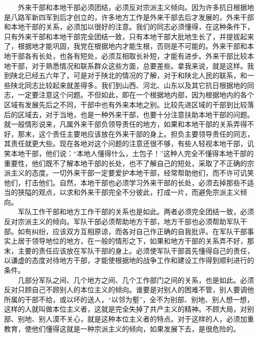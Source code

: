 \documentclass[cn,11pt,chinese]{elegantbook}
\begin{document}
　　外来干部和本地干部必须团结，必须反对宗派主义倾向。因为许多抗日根据地是八路军新四军到后才创立的，许多地方工作是外来干部去后才发展的，外来干部和本地干部的关系，必须加以很好的注意。我们的同志必须懂得，在这种条件下，只有外来干部和本地干部完全团结一致，只有本地干部大批地生长了，并提拔起来了，根据地才能巩固，我党在根据地内才能生根，否则是不可能的。外来干部和本地干部各有长处，也各有短处，必须互相取长补短，才能有进步。外来干部比较本地干部，对于熟悉情况和联系群众这些方面，总要差些。拿我来说，就是这样。我到陕北已经五六年了，可是对于陕北的情况的了解，对于和陕北人民的联系，和一些陕北同志比较起来就差得多。我们到山西、河北、山东以及其它抗日根据地的同志，一定要注意这个问题。不但如此，即在一个根据地内部，因为根据地内的各个区域有发展先后之不同，干部中也有外来本地之别。比较先进区域的干部到比较落后的区域去，对于当地，也是一种外来干部，也要十分注意扶助本地干部的问题。就一般情形说来，凡属外来干部负领导责任的地方，如果和本地干部的关系弄得不好，那末，这个责任主要地应该放在外来干部的身上。担负主要领导责任的同志，其责任就更大些。现在各地对这个问题的注意还很不够，有些人轻视本地干部，讥笑本地干部，他们说：“本地人懂得什么，土包子！”这种人完全不懂得本地干部的重要性，他们既不了解本地干部的长处，也不了解自己的短处，采取了不正确的宗派主义的态度。一切外来干部一定要爱护本地干部，经常帮助他们，而不许可讥笑他们，打击他们。自然，本地干部也必须学习外来干部的长处，必须去掉那些不适当的狭隘的观点，以求和外来干部完全不分彼此，打成一片，而避免宗派主义倾向。\\
　　军队工作干部和地方工作干部的关系也是如此。两者必须完全团结一致，必须反对宗派主义的倾向。军队干部必须帮助地方干部，地方干部也必须帮助军队干部。如有纠纷，应该双方互相原谅，而各对自己作正确的自我批评。在军队干部事实上居于领导地位的地方，在一般的情形之下，如果和地方干部的关系弄不好，那末，主要的责任应该放在军队干部的身上。必须使军队干部首先懂得自己的责任，以谦虚的态度对待地方干部，才能使根据地的战争工作和建设工作得到顺利进行的条件。\\
　　几部分军队之间、几个地方之间、几个工作部门之间的关系，也是如此。必须反对只顾自己不顾别人的本位主义的倾向。谁要是对别人的困难不管，别人要调他所属的干部不给，或以坏的送人，“以邻为壑”，全不为别部、别地、别人想一想，这样的人就叫做本位主义者，这就是完全失掉了共产主义的精神。不顾大局，对别部、别地、别人漠不关心，就是这种本位主义者的特点。对于这样的人，必须加重教育，使他们懂得这就是一种宗派主义的倾向，如果发展下去，是很危险的。\\
\end{document}
